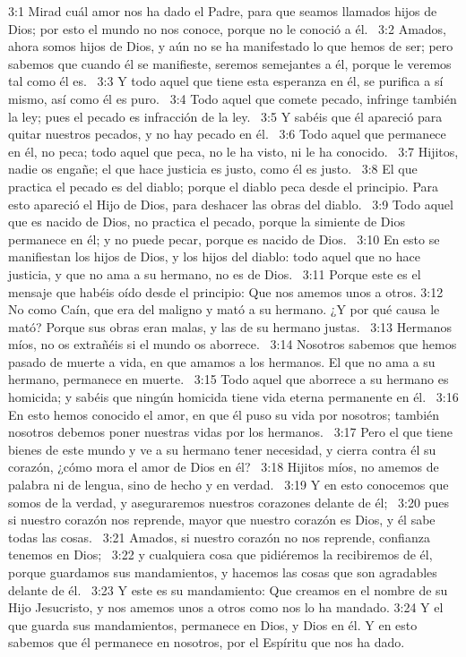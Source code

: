 3:1 Mirad cuál amor nos ha dado el Padre, para que seamos llamados hijos de Dios; por esto el mundo no nos conoce, porque no le conoció a él.  
3:2 Amados, ahora somos hijos de Dios, y aún no se ha manifestado lo que hemos de ser; pero sabemos que cuando él se manifieste, seremos semejantes a él, porque le veremos tal como él es.  
3:3 Y todo aquel que tiene esta esperanza en él, se purifica a sí mismo, así como él es puro.  
3:4 Todo aquel que comete pecado, infringe también la ley; pues el pecado es infracción de la ley.  
3:5 Y sabéis que él apareció para quitar nuestros pecados, y no hay pecado en él.  
3:6 Todo aquel que permanece en él, no peca; todo aquel que peca, no le ha visto, ni le ha conocido.  
3:7 Hijitos, nadie os engañe; el que hace justicia es justo, como él es justo.  
3:8 El que practica el pecado es del diablo; porque el diablo peca desde el principio. Para esto apareció el Hijo de Dios, para deshacer las obras del diablo.  
3:9 Todo aquel que es nacido de Dios, no practica el pecado, porque la simiente de Dios permanece en él; y no puede pecar, porque es nacido de Dios.  
3:10 En esto se manifiestan los hijos de Dios, y los hijos del diablo: todo aquel que no hace justicia, y que no ama a su hermano, no es de Dios.  
3:11 Porque este es el mensaje que habéis oído desde el principio: Que nos amemos unos a otros. 
3:12 No como Caín, que era del maligno y mató a su hermano. ¿Y por qué causa le mató? Porque sus obras eran malas, y las de su hermano justas.  
3:13 Hermanos míos, no os extrañéis si el mundo os aborrece.  
3:14 Nosotros sabemos que hemos pasado de muerte a vida, en que amamos a los hermanos. El que no ama a su hermano, permanece en muerte.  
3:15 Todo aquel que aborrece a su hermano es homicida; y sabéis que ningún homicida tiene vida eterna permanente en él.  
3:16 En esto hemos conocido el amor, en que él puso su vida por nosotros; también nosotros debemos poner nuestras vidas por los hermanos.  
3:17 Pero el que tiene bienes de este mundo y ve a su hermano tener necesidad, y cierra contra él su corazón, ¿cómo mora el amor de Dios en él?  
3:18 Hijitos míos, no amemos de palabra ni de lengua, sino de hecho y en verdad.  
3:19 Y en esto conocemos que somos de la verdad, y aseguraremos nuestros corazones delante de él;  
3:20 pues si nuestro corazón nos reprende, mayor que nuestro corazón es Dios, y él sabe todas las cosas.  
3:21 Amados, si nuestro corazón no nos reprende, confianza tenemos en Dios;  
3:22 y cualquiera cosa que pidiéremos la recibiremos de él, porque guardamos sus mandamientos, y hacemos las cosas que son agradables delante de él.  
3:23 Y este es su mandamiento: Que creamos en el nombre de su Hijo Jesucristo, y nos amemos unos a otros como nos lo ha mandado. 
3:24 Y el que guarda sus mandamientos, permanece en Dios, y Dios en él. Y en esto sabemos que él permanece en nosotros, por el Espíritu que nos ha dado.  
